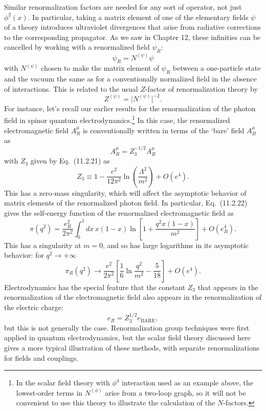 Similar renormalization factors are needed for any sort of operator, not just
$\phi^2(x)$. In particular, taking a matrix element of one of the elementary
fields $\psi$ of a theory introduces ultraviolet divergences that arise from
radiative corrections to the corresponding propagator. As we saw in Chapter
12, these infinities can be cancelled by working with a renormalized field
$\psi_R$:
\begin{equation}
 \psi_R=N^{(\psi)}\psi
 \tag{18.1.14}
 \label{eq:18.1.14}
\end{equation}
with $N^{(\psi)}$ chosen to make the matrix element of $\psi_R$ between a
one-particle state and the vacuum the same as for a conventionally normalized
field in the absence of interactions. This is related to the usual $Z$-factor
of renormalization theory by
\begin{equation}
 Z^{(\psi)}=\lvert N^{(\psi)}\rvert^{-2} .
 \tag{18.1.15}
 \label{eq:18.1.15}
\end{equation}
For instance, let's recall our earlier results for the renormalization of the
photon field in spinor quantum electrodynamics.\footnote{In the scalar field
theory with $\phi^4$ interaction used as an example above, the lowest-order
terms in $N^{(\phi)}$ arise from a two-loop graph, so it will not be convenient
to use this theory to illustrate the calculation of the $N$-factors.} In this
case, the renormalized electromagnetic field $A_R^\mu$ is conventionally
written in terms of the `bare' field $A_B^\mu$ as
\[
 A_R^\mu=Z_3^{-1/2}A_B^\mu
\]
with $Z_3$ given by Eq.~(11.2.21) as
\begin{equation}
 Z_3\equiv1-\frac{e^2}{12\pi^2}\ln\left(\frac{\Lambda^2}{m^2}\right)
 +O(e^4) .
 \tag{18.1.16}
 \label{eq:18.1.16}
\end{equation}
This has a zero-mass singularity, which will affect the asymptotic behavior of
matrix elements of the renormalized photon field. In particular,
Eq.~(11.2.22) gives the self-energy function of the renormalized
electromagnetic field as
\begin{equation}
 \pi(q^2)=\frac{e_R^2}{2\pi^2}\int_0^1dx\,x(1-x)
 \ln\left[1+\frac{q^2x(1-x)}{m^2}\right]+O(e_R^4) .
 \tag{18.1.17}
 \label{eq:18.1.17}
\end{equation}
This has a singularity at $m=0$, and so has large logarithms in its
asymptotic behavior: for $q^2\to+\infty$
\begin{equation}
 \pi_R(q^2)\longrightarrow\frac{e^2}{2\pi^2}
 \left[\frac{1}{6}\ln\frac{q^2}{m^2}-\frac{5}{18}\right]+O(e^4) .
 \tag{18.1.18}
 \label{eq:18.1.18}
\end{equation}
Electrodynamics has the special feature that the constant $Z_3$ that appears
in the renormalization of the electromagnetic field also appears in the
renormalization of the electric charge:
\begin{equation}
 e_R=Z_3^{1/2}e_{\mathrm{BARE}} ,
 \tag{18.1.19}
 \label{eq:18.1.19}
\end{equation}
but this is not generally the case. Renormalization group techniques were
first applied in quantum electrodynamics, but the scalar field theory
discussed here gives a more typical illustration of these methods, with
separate renormalizations for fields and couplings.
